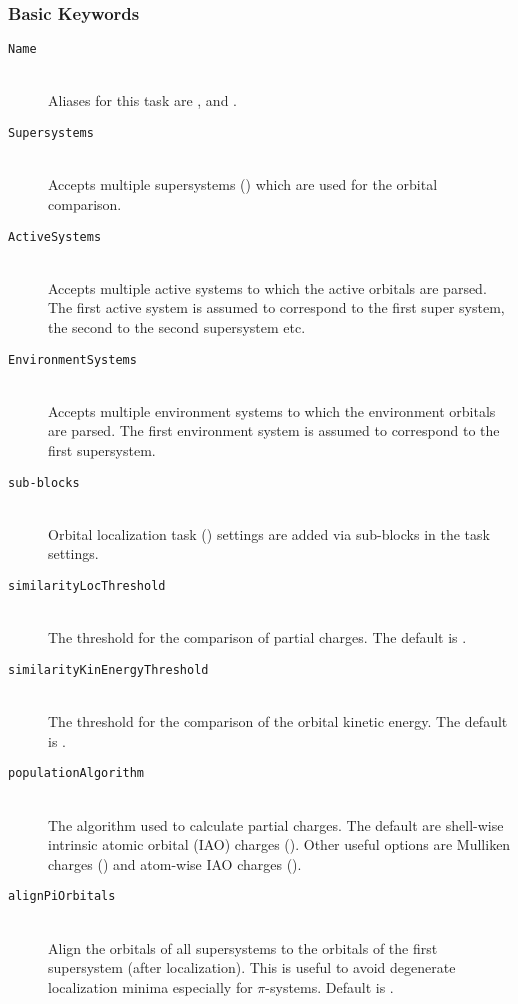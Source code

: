 \subsubsection{Basic Keywords}
\begin{description}
 \item [\texttt{Name}]\hfill \\
 Aliases for this task are ,  and .  
 \item [\texttt{Supersystems}]\hfill \\
 Accepts multiple supersystems () which are used for the orbital comparison.   
 \item [\texttt{ActiveSystems}]\hfill \\
 Accepts multiple active systems to which the active orbitals are parsed. The first
 active system is assumed to correspond to the first super system, the second to the second
 supersystem etc. 
 \item [\texttt{EnvironmentSystems}]\hfill \\
 Accepts multiple environment systems to which the environment orbitals are parsed. The first
 environment system is assumed to correspond to the first supersystem. 
 \item [\texttt{sub-blocks}]\hfill \\
 Orbital localization task () settings are added via sub-blocks in the task settings.
 \item [\texttt{similarityLocThreshold}]\hfill \\
 The threshold for the comparison of partial charges. The default is .
 \item [\texttt{similarityKinEnergyThreshold}]\hfill \\
 The threshold for the comparison of the orbital kinetic energy. The default is .
 \item [\texttt{populationAlgorithm}]\hfill \\
 The algorithm used to calculate partial charges. The default are shell-wise intrinsic atomic orbital (IAO)
 charges (). Other useful options are Mulliken charges () and atom-wise IAO
 charges ().
 \item [\texttt{alignPiOrbitals}]\hfill \\
 Align the orbitals of all supersystems to the orbitals of the first supersystem (after localization). This
 is useful to avoid degenerate localization minima especially for $\pi$-systems. Default is .
\end{description}
